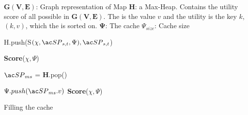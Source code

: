 
\begin{algorithm}[H!bt]
\dontprintsemicolon
\SetVline


\KwData
{

	$\mathbf{G(V,E)}$: Graph representation of Map \;
	\textbf{H}: a Max-Heap. Contains the utility score of all possible \spaths in $\mathbf{G(V,E)}$. The \spath is the value $v$ and the utility is the key $k$, $(k, v)$, which the is sorted on.\;
	$\mathbf{\Psi}$: The cache \;
	$\Psi_{size}$: Cache size \;
}



{
    H.push(S$(\chi, \spath_{s,t}, \Psi), \spath_{s,t}$) \;
}

\textbf{Score}($\chi, \Psi$) \;

{
	$\spath_{ms}$ = \textbf{H}.pop() \; 
	{
		$\Psi.push(\spath_{ms}.v)$\;
		\textbf{Score}($\chi, \Psi$) \;
		
	}
}

\caption{Filling the cache}
\label{alg:greedy}
\end{algorithm}